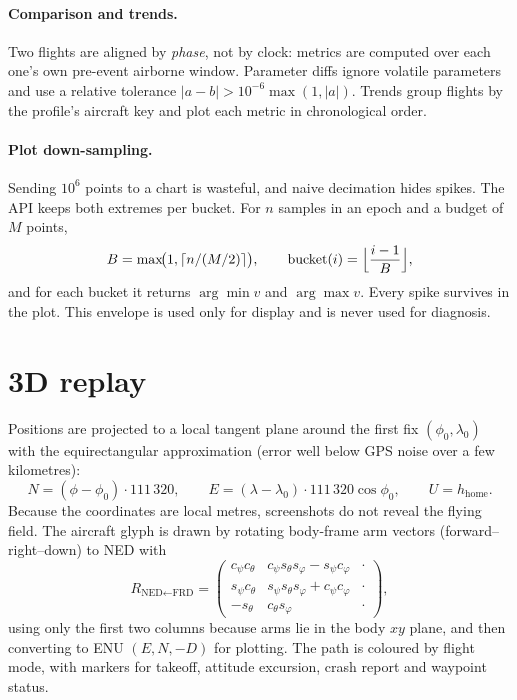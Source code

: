 \documentclass[11pt,a4paper]{article}
\begin{document}
\paragraph{Comparison and trends.} Two flights are aligned by \emph{phase}, not by clock: metrics
are computed over each one's own pre-event airborne window. Parameter diffs ignore volatile
parameters and use a relative tolerance $|a-b|>10^{-6}\max(1,|a|)$. Trends group flights by the
profile's aircraft key and plot each metric in chronological order.

\paragraph{Plot down-sampling.} Sending $10^6$ points to a chart is wasteful, and naive decimation
hides spikes. The API keeps both extremes per bucket. For $n$ samples in an epoch and a budget of
$M$ points,
\[
B=\max\!\bigl(1,\lceil n/(M/2)\rceil\bigr),\qquad
\text{bucket}(i)=\Bigl\lfloor\frac{i-1}{B}\Bigr\rfloor,
\]
and for each bucket it returns $\arg\min v$ and $\arg\max v$. Every spike survives in the plot.
This envelope is used only for display and is never used for diagnosis.

\section{3D replay}

Positions are projected to a local tangent plane around the first fix $(\phi_0,\lambda_0)$ with the
equirectangular approximation (error well below GPS noise over a few kilometres):
\[
N=(\phi-\phi_0)\cdot111\,320,\qquad
E=(\lambda-\lambda_0)\cdot111\,320\cos\phi_0,\qquad U=h_{\text{home}} .
\]
Because the coordinates are local metres, screenshots do not reveal the flying field.
The aircraft glyph is drawn by rotating body-frame arm vectors (forward--right--down) to NED with
\[
R_{\text{NED}\leftarrow\text{FRD}}=
\begin{pmatrix}
c_\psi c_\theta & c_\psi s_\theta s_\varphi-s_\psi c_\varphi & \cdot\\
s_\psi c_\theta & s_\psi s_\theta s_\varphi+c_\psi c_\varphi & \cdot\\
-s_\theta & c_\theta s_\varphi & \cdot
\end{pmatrix},
\]
using only the first two columns because arms lie in the body $xy$ plane, and then converting to ENU
$(E,N,-D)$ for plotting. The path is coloured by flight mode, with markers for takeoff, attitude
excursion, crash report and waypoint status.
\end{document}
